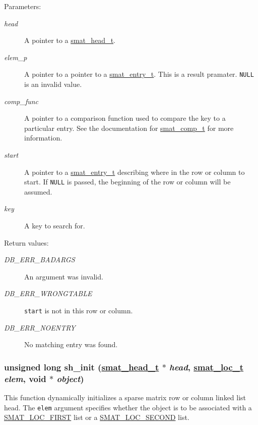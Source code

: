 \begin{Desc}
\item[Parameters:]
\begin{description}
\item[{\em head}]A pointer to a \hyperlink{group__dbprim__smat_a1}{smat\_\-head\_\-t}. \item[{\em elem\_\-p}]A pointer to a pointer to a \hyperlink{group__dbprim__smat_a2}{smat\_\-entry\_\-t}. This is a result pramater. {\tt NULL} is an invalid value. \item[{\em comp\_\-func}]A pointer to a comparison function used to compare the key to a particular entry. See the documentation for \hyperlink{group__dbprim__smat_a5}{smat\_\-comp\_\-t} for more information. \item[{\em start}]A pointer to a \hyperlink{group__dbprim__smat_a2}{smat\_\-entry\_\-t} describing where in the row or column to start. If {\tt NULL} is passed, the beginning of the row or column will be assumed. \item[{\em key}]A key to search for.\end{description}
\end{Desc}
\begin{Desc}
\item[Return values:]
\begin{description}
\item[{\em DB\_\-ERR\_\-BADARGS}]An argument was invalid. \item[{\em DB\_\-ERR\_\-WRONGTABLE}]{\tt start} is not in this row or column. \item[{\em DB\_\-ERR\_\-NOENTRY}]No matching entry was found. \end{description}
\end{Desc}
\hypertarget{group__dbprim__smat_a17}{
\subsubsection[sh\_\-init]{\setlength{\rightskip}{0pt plus 5cm}unsigned long sh\_\-init (\hyperlink{dbprim_8h_a1}{smat\_\-head\_\-t} $\ast$ {\em head}, \hyperlink{dbprim_8h_a6}{smat\_\-loc\_\-t} {\em elem}, void $\ast$ {\em object})}}
\label{group__dbprim__smat_a17}


This function dynamically initializes a sparse matrix row or column linked list head. The {\tt elem} argument specifies whether the object is to be associated with a \hyperlink{group__dbprim__smat_a47a135}{SMAT\_\-LOC\_\-FIRST} list or a \hyperlink{group__dbprim__smat_a47a136}{SMAT\_\-LOC\_\-SECOND} list.

